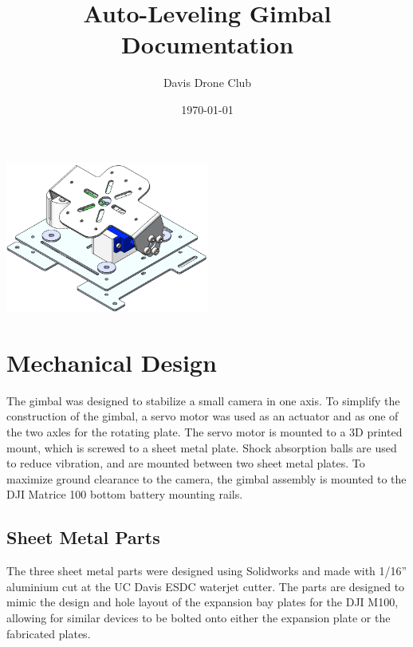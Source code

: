 \documentclass[11pt]{article} %
\title{Auto-Leveling Gimbal Documentation}
\author{Davis Drone Club}
\date{\today} %
\begin{document}
\maketitle
\begin{center}
\includegraphics[width = 0.5\textwidth]{Pictures/cover.png}
\end{center}

\newpage
\tableofcontents
{}
\newpage
\listoffigures
\listoftables

\newpage
{}
\setlength{\parskip}{1em}
\section{Mechanical Design}

The gimbal was designed to stabilize a small camera in one axis. To simplify the construction of the gimbal, a servo motor was used as an actuator and as one of
the two axles for the rotating plate. The servo motor is mounted to a 3D printed mount, which is screwed to a sheet metal plate. Shock absorption balls are used to reduce vibration, and are mounted between two sheet metal plates. To maximize ground clearance to the camera, the gimbal assembly is mounted to the DJI Matrice 100 bottom battery mounting rails. 

\subsection{Sheet Metal Parts}
The three sheet metal parts were designed using Solidworks and made with 1/16'' aluminium cut at the UC Davis ESDC waterjet cutter. The parts are designed to mimic the design and hole layout of the expansion bay plates for the DJI M100, allowing for similar devices to be bolted onto either the expansion plate or the fabricated plates.
\end{document}
